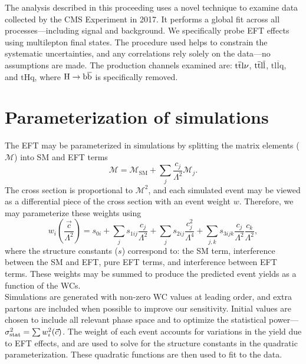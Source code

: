 \documentclass[12pt]{article}
\begin{document}
The analysis described in this proceeding uses a novel technique to examine data collected by the CMS Experiment in 2017. It performs a global fit across all processes---including signal and background. We specifically probe EFT effects using multilepton final states. The procedure used helps to constrain the systematic uncertainties, and any correlations rely solely on the data---no assumptions are made. The production channels examined are: $\mathrm{\mathrm{t\overline{t}} l\nu}$, $\mathrm{\mathrm{t\overline{t}} l\overline{l}}$, $\mathrm{t l\overline{l}q}$, and $\mathrm{tHq}$, where $\mathrm{H \to \mathrm{b\overline{b}}}$ is specifically removed.\\

\section{Parameterization of simulations}

The EFT may be parameterized in simulations by splitting the matrix elements ($\mathcal{M}$) into SM and EFT terms
\begin{equation}
	\mathcal{M} = \mathcal{M}_{\mathrm{SM}} + \sum_{j} \frac{c_j}{\Lambda^2} \mathcal{M}_j.
\end{equation}
The cross section is proportional to $\mathcal{M}^2$, and each simulated event may be viewed as a differential piece of the cross section with an event weight $w$. Therefore, we may parameterize these weights using
\begin{equation}
	w_i\left(\frac{\vec{c}}{\Lambda^2}\right) = s_{0i} + \sum_js_{1ij}\frac{c_j}{\Lambda^2} + \sum_js_{2ij}\frac{c_j^2}{\Lambda^4} + \sum_{j,k}s_{3ijk} \frac{c_j}{\Lambda^2} \frac{c_k}{\Lambda^2},
\end{equation}
where the structure constants ($s$) correspond to: the SM term, interference between the SM and EFT, pure EFT terms, and interference between EFT terms. These weights may be summed to produce the predicted event yields as a function of the WCs.\\

Simulations are generated with non-zero WC values at leading order, and extra partons are included when possible to improve our sensitivity. Initial values are chosen to include all relevant phase space and to optimize the statistical power---$\sigma^2_{\mathrm{stat}} = \sum w^2_i(\vec{c})$. The weight of each event accounts for variations in the yield due to EFT effects, and are used to solve for the structure constants in the quadratic parameterization. These quadratic functions are then used to fit to the data.\\
\end{document}
